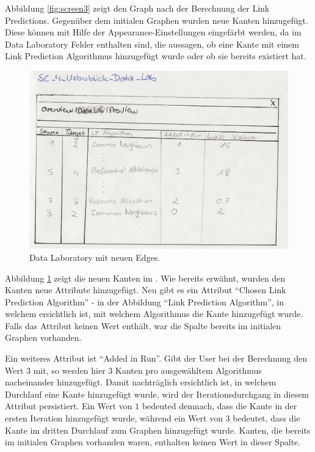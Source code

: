 Abbildung \ref{fig:screen3} zeigt den Graph nach der Berechnung der Link Predictions.
Gegenüber dem initialen Graphen wurden neue Kanten hinzugefügt.
Diese können mit Hilfe der Appearance-Einstellungen eingefärbt werden, da im Data Laboratory Felder enthalten sind, die aussagen, ob eine
Kante mit einem Link Prediction Algorithmus hinzugefügt wurde oder ob sie bereits existiert hat.

\begin{figure}
    \includegraphics[width=\linewidth]{resources/SC-4.png}
    \caption{Data Laboratory mit neuen Edges.}
    \label{fig:screen4}
\end{figure}

Abbildung \ref{fig:screen4} zeigt die neuen Kanten im .
Wie bereits erwähnt, wurden den Kanten neue Attribute hinzugefügt.
Neu gibt es ein Attribut ``Chosen Link Prediction Algorithm'' - in der Abbildung ``Link Prediction Algorithm'', in welchem ersichtlich ist, mit welchem Algorithmus die Kante hinzugefügt wurde.
Falls das Attribut keinen Wert enthält, war die Spalte bereits im initialen Graphen vorhanden.

Ein weiteres Attribut ist ``Added in Run''. Gibt der User bei der Berechnung den Wert $3$ mit, so werden hier 3 Kanten pro
ausgewähltem Algorithmus nacheinander hinzugefügt. Damit nachträglich ersichtlich ist, in welchem Durchlauf eine
Kante hinzugefügt wurde, wird der Iterationsdurchgang in diesem Attribut persistiert.
Ein Wert von $1$ bedeuted demnach, dass die Kante in der ersten Iteration hinzugefügt wurde, während ein Wert von $3$ bedeutet, dass die Kante im dritten Durchlauf zum Graphen hinzugefügt wurde.
Kanten, die bereits im initialen Graphen vorhanden waren, enthalten keinen Wert in dieser Spalte.

